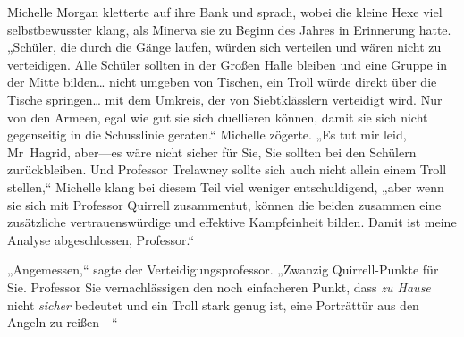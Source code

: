 Michelle Morgan kletterte auf ihre Bank und sprach, wobei die kleine Hexe viel selbstbewusster klang, als Minerva sie zu Beginn des Jahres in Erinnerung hatte. „Schüler, die durch die Gänge laufen, würden sich verteilen und wären nicht zu verteidigen. Alle Schüler sollten in der Großen Halle bleiben und eine Gruppe in der Mitte bilden… nicht umgeben von Tischen, ein Troll würde direkt über die Tische springen… mit dem Umkreis, der von Siebtklässlern verteidigt wird. Nur von den Armeen, egal wie gut sie sich duellieren können, damit sie sich nicht gegenseitig in die Schusslinie geraten.“ Michelle zögerte. „Es tut mir leid, Mr~Hagrid, aber—es wäre nicht sicher für Sie, Sie sollten bei den Schülern zurückbleiben. Und Professor Trelawney sollte sich auch nicht allein einem Troll stellen,“ Michelle klang bei diesem Teil viel weniger entschuldigend, „aber wenn sie sich mit Professor Quirrell zusammentut, können die beiden zusammen eine zusätzliche vertrauenswürdige und effektive Kampfeinheit bilden. Damit ist meine Analyse abgeschlossen, Professor.“

„Angemessen,“ sagte der Verteidigungsprofessor. „Zwanzig Quirrell-Punkte für Sie. Professor Sie vernachlässigen den noch einfacheren Punkt, dass \emph{zu Hause} nicht \emph{sicher} bedeutet und ein Troll stark genug ist, eine Porträttür aus den Angeln zu reißen—“

